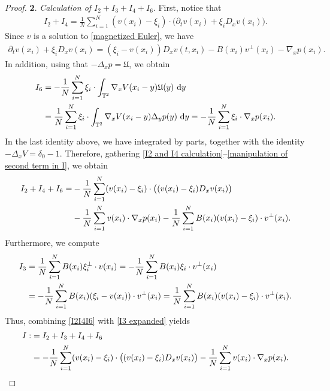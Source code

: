 \documentclass[11pt,reqno]{amsart}
\numberwithin{equation}{section}
\def\dd{{\rm d}}
\begin{document}
\begin{proof}
\smallskip
\textbf{2}. \textit{Calculation of $I_{2}+I_{3}+I_{4}+I_{6}$}. First, notice that
\begin{align}
I_{2}+I_{4}
=\frac{1}{N}\sum_{i=1}^{N}(v(x_{i})-\xi_{i})\cdot 
\big(\partial_{t}v(x_{i})+\xi_{i}D_{x}v(x_{i})\big). \label{I2 and I4 calculation} 
\end{align}
Since $v$ is a solution to \eqref{magnetized Euler}, we have
\begin{align}
\partial_{t}v(x_{i})+\xi_{i}D_{x}v(x_{i})=(\xi_{i}-v(x_{i}))D_{x}v(t,x_{i})-B(x_{i})v^{\perp}(x_{i})-\nabla_{x} p(x_{i}).  \label{manipulation of first term in I}    
\end{align}
In addition, using that $-\Delta_{x} p=\mathfrak{U}$, we obtain
\begin{align}
I_{6}&=-\frac{1}{N}\sum_{i=1}^{N}\xi_{i}\cdot \int_{\mathbb{T}^{2}} \nabla_{x} V(x_{i}-y)\mathfrak{U}(y)\ \dd y \notag\\
&=\frac{1}{N}\sum_{i=1}^{N} \xi_{i}\cdot \int_{\mathbb{T}^{2}} \nabla_{x} V(x_{i}-y)\Delta_{y} p(y)\ \dd y=-\frac{1}{N}\sum_{i=1}^{N}\xi_{i}\cdot \nabla_{x} p(x_{i}). \label{manipulation of second term in I}  
\end{align}
In the last identity above, we have integrated by parts, together with the identity 
$-\Delta_{x} V=\delta_{0}-1$. 
Therefore, gathering \eqref{I2 and I4 calculation}--\eqref{manipulation of second term in I}, 
we obtain 
\begin{align}
I_{2}+I_{4}+I_{6}=&-\frac{1}{N}\sum_{i=1}^{N}(v(x_{i})-\xi_{i})\cdot\big((v(x_{i})-\xi_{i})D_{x}v(x_{i})\big) \notag\\
&-\frac{1}{N}\sum_{i=1}^{N}v(x_{i})\cdot \nabla_{x} p (x_{i})-\frac{1}{N}\sum_{i=1}^{N}B(x_{i})(v(x_{i})-\xi_{i})\cdot v^{\perp}(x_{i}). \label{I2I4I6} 
\end{align}
Furthermore, we compute 
\begin{align}
I_{3}&=\frac{1}{N}\sum_{i=1}^{N}B(x_{i})\xi_{i}^{\perp}\cdot v(x_{i})=-\frac{1}{N}\sum_{i=1}^{N}B(x_{i})\xi_{i}\cdot v^{\perp}(x_{i}) \notag\\
&=-\frac{1}{N}\sum_{i=1}^{N}B(x_{i})(\xi_{i}-v(x_{i}))\cdot v^{\perp}(x_{i})=\frac{1}{N}\sum_{i=1}^{N}B(x_{i})(v(x_{i})-\xi_{i})\cdot v^{\perp}(x_{i}). \label{I3 expanded}      
\end{align}
Thus, combining \eqref{I2I4I6} with \eqref{I3 expanded} yields
\begin{align}
I:&= I_{2}+I_{3}+I_{4}+I_{6}\notag\\
&=-\frac{1}{N}\sum_{i=1}^{N}(v(x_{i})-\xi_{i})\cdot\big((v(x_{i})-\xi_{i})D_{x}v(x_{i})\big)
-\frac{1}{N}\sum_{i=1}^{N}v(x_{i})\cdot \nabla_{x} p(x_{i}).  \label{I2-I8 formula}  
\end{align}


\end{proof}
\end{document}
